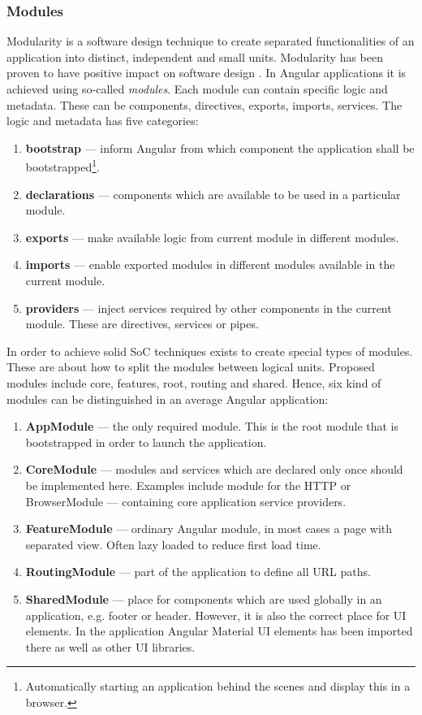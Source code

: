 \documentclass{article} %
\begin{document}
\subsubsection{Modules}
\label{sec:module}
Modularity is a software design technique to create separated functionalities of an application into distinct, independent and small units. Modularity has been proven to have positive impact on software design \cite{bib:modularity}. In Angular applications it is achieved using so-called \textit{modules}. Each module can contain specific logic and metadata. These can be components, directives, exports, imports, services. The logic and metadata has five categories:
\begin{enumerate}
    \item \textbf{bootstrap} --- inform Angular from which component the application shall be bootstrapped\footnote{Automatically starting an application behind the scenes and display this in a browser.}.
    \item \textbf{declarations} --- components which are available to be used in a particular module.
    \item \textbf{exports} --- make available logic from current module in different modules.
    \item \textbf{imports} --- enable exported modules in different modules available in the current module.
    \item \textbf{providers} --- inject services required by other components in the current module. These are directives, services or pipes.
\end{enumerate}
In order to achieve solid SoC techniques exists to create special types of modules. These are about how to split the modules between logical units. Proposed modules include core, features, root, routing and shared. Hence, six kind of modules can be distinguished in an average Angular application:
\begin{enumerate}
    \item \textbf{AppModule} --- the only required module. This is the root module that is bootstrapped in order to launch the application.
    \item \textbf{CoreModule} --- modules and services which are declared only once should be implemented here. Examples include module for the HTTP or BrowserModule --- containing core application service providers.
    \item \textbf{FeatureModule} --- ordinary Angular module, in most cases a page with separated view. Often lazy loaded to reduce first load time.
    \item \textbf{RoutingModule} --- part of the application to define all URL paths.
    \item \textbf{SharedModule} --- place for components which are used globally in an application, e.g. footer or header. However, it is also the correct place for UI elements. In the application Angular Material UI elements has been imported there as well as other UI libraries.
\end{enumerate}
\end{document}
